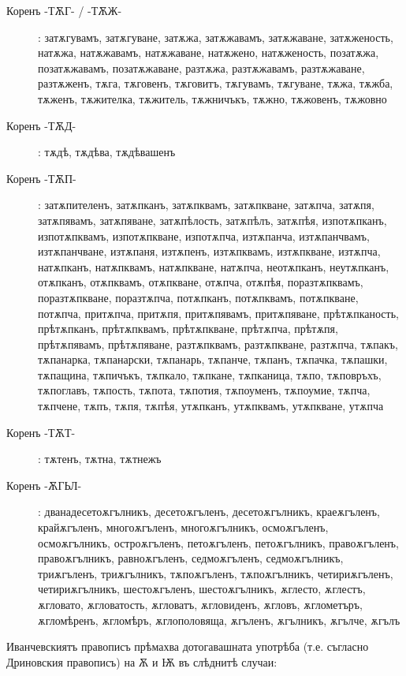 \documentclass{article}
\begin{document}
\begin{description}
	\item[Коренъ -ТѪГ- / -ТѪЖ-]: затѫгувамъ, затѫгуване, затѫжа, затѫжавамъ, затѫжаване, затѫженость, натѫжа, натѫжавамъ, натѫжаване, натѫжено, натѫженость, позатѫжа, позатѫжавамъ, позатѫжаване, разтѫжа, разтѫжавамъ, разтѫжаване, разтѫженъ, тѫга, тѫговенъ, тѫговитъ, тѫгувамъ, тѫгуване, тѫжа, тѫжба, тѫженъ, тѫжителка, тѫжитель, тѫжничъкъ, тѫжно, тѫжовенъ, тѫжовно
	
	\item[Коренъ -ТѪД-]: тѫдѣ, тѫдѣва, тѫдѣвашенъ
	
	\item[Коренъ -ТѪП-]: затѫпителенъ, затѫпканъ, затѫпквамъ, затѫпкване, затѫпча, затѫпя, затѫпявамъ, затѫпяване, затѫпѣлость, затѫпѣлъ, затѫпѣя, изпотѫпканъ, изпотѫпквамъ, изпотѫпкване, изпотѫпча, изтѫпанча, изтѫпанчвамъ, изтѫпанчване, изтѫпаня, изтѫпенъ, изтѫпквамъ, изтѫпкване, изтѫпча, натѫпканъ, натѫпквамъ, натѫпкване, натѫпча, неотѫпканъ, неутѫпканъ, отѫпканъ, отѫпквамъ, отѫпкване, отѫпча, отѫпѣя, поразтѫпквамъ, поразтѫпкване, поразтѫпча, потѫпканъ, потѫпквамъ, потѫпкване, потѫпча, притѫпча, притѫпя, притѫпявамъ, притѫпяване, прѣтѫпканость, прѣтѫпканъ, прѣтѫпквамъ, прѣтѫпкване, прѣтѫпча, прѣтѫпя, прѣтѫпявамъ, прѣтѫпяване, разтѫпквамъ, разтѫпкване, разтѫпча, тѫпакъ, тѫпанарка, тѫпанарски, тѫпанарь, тѫпанче, тѫпанъ, тѫпачка, тѫпашки, тѫпащина, тѫпичъкъ, тѫпкало, тѫпкане, тѫпканица, тѫпо, тѫповръхъ, тѫпоглавъ, тѫпость, тѫпота, тѫпотия, тѫпоуменъ, тѫпоумие, тѫпча, тѫпчене, тѫпъ, тѫпя, тѫпѣя, утѫпканъ, утѫпквамъ, утѫпкване, утѫпча
	
	\item[Коренъ -ТѪТ-]: тѫтенъ, тѫтна, тѫтнежъ

	\item[Коренъ -ѪГЬЛ-]: дванадесетоѫгълникъ, десетоѫгъленъ, десетоѫгълникъ, краеѫгъленъ, крайѫгъленъ, многоѫгъленъ, многоѫгълникъ, осмоѫгъленъ, осмоѫгълникъ, остроѫгъленъ, петоѫгъленъ, петоѫгълникъ, правоѫгъленъ, правоѫгълникъ, равноѫгъленъ, седмоѫгъленъ, седмоѫгълникъ, триѫгъленъ, триѫгълникъ, тѫпоѫгъленъ, тѫпоѫгълникъ, четириѫгъленъ, четириѫгълникъ, шестоѫгъленъ, шестоѫгълникъ, ѫглесто, ѫглестъ, ѫгловато, ѫгловатость, ѫгловатъ, ѫгловиденъ, ѫгловъ, ѫглометъръ, ѫгломѣренъ, ѫгломѣръ, ѫглополовяща, ѫгъленъ, ѫгълникъ, ѫгълче, ѫгълъ

 	\end{description}

Иванчевскиятъ правописъ прѣмахва дотогавашната употрѣба (т.е. съгласно Дриновския правописъ) на Ѫ и Ѭ въ слѣднитѣ случаи:
\end{document}
